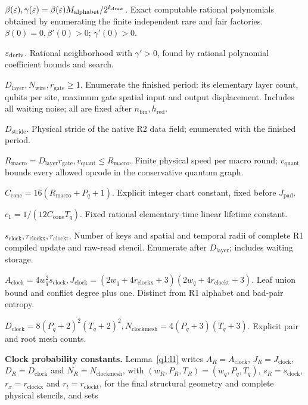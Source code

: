 \noindent\textbf{\(\beta(\varepsilon),\gamma(\varepsilon)=\beta(\varepsilon)M_{\mathrm{alphabet}}/2^{k_{\mathrm{draw}}}\)}. Exact computable rational polynomials obtained by enumerating the finite independent rare and fair factories. \(\beta(0)=0,\beta'(0)>0\); \(\gamma'(0)>0\).\par\smallskip
\noindent\textbf{\(\varepsilon_{\mathrm{deriv}}\)}. Rational neighborhood with \(\gamma'>0\), found by rational polynomial coefficient bounds and search.\par\smallskip
\noindent\textbf{\(D_{\mathrm{layer}},N_{\mathrm{wire}},r_{\mathrm{gate}}\ge 1\)}. Enumerate the finished period: its elementary layer count, qubits per site, maximum gate spatial input and output displacement. Includes all waiting noise; all are fixed after \(n_{\mathrm{bin}},h_{\mathrm{red}}\).\par\smallskip
\noindent\textbf{\(D_{\mathrm{stride}}\)}. Physical stride of the native R2 data field; enumerated with the finished period.\par\smallskip
\noindent\textbf{\(R_{\mathrm{macro}}=D_{\mathrm{layer}} r_{\mathrm{gate}},v_{\mathrm{quant}}\le R_{\mathrm{macro}}\)}. Finite physical speed per macro round; \(v_{\mathrm{quant}}\) bounds every allowed opcode in the conservative quantum graph.\par\smallskip
\noindent\textbf{\(C_{\mathrm{cone}}=16(R_{\mathrm{macro}}+P_{q}+1)\)}. Explicit integer chart constant, fixed before \(J_{\mathrm{pad}}\).\par\smallskip
\noindent\textbf{\(c_{1}=1/(12 C_{\mathrm{cone}} T_{q})\)}. Fixed rational elementary-time linear lifetime constant.\par\smallskip
\noindent\textbf{\(s_{\mathrm{clock}},r_{\mathrm{clockx}},r_{\mathrm{clockt}}\)}. Number of keys and spatial and temporal radii of complete R1 compiled update and raw-read stencil. Enumerate after \(D_{\mathrm{layer}}\); includes waiting storage.\par\smallskip
\noindent\textbf{\(A_{\mathrm{clock}}=4w_{q}^{2} s_{\mathrm{clock}},J_{\mathrm{clock}}=(2w_{q}+4r_{\mathrm{clockx}}+3)(2w_{q}+4r_{\mathrm{clockt}}+3)\)}. Leaf union bound and conflict degree plus one. Distinct from R1 alphabet and bad-pair entropy.\par\smallskip
\noindent\textbf{\(D_{\mathrm{clock}}=8(P_{q}+2)^{2}(T_{q}+2)^{2},N_{\mathrm{clockmesh}}=4(P_{q}+3)(T_{q}+3)\)}. Explicit pair and root mesh counts.\par\smallskip
\noindent\textbf{Clock probability constants.} Lemma~\ref{q1:l1} writes \(A_R=A_{\mathrm{clock}}\), \(J_R=J_{\mathrm{clock}}\), \(D_R=D_{\mathrm{clock}}\) and \(N_R=N_{\mathrm{clockmesh}}\), with \((w_R,P_R,T_R)=(w_q,P_q,T_q)\), \(s_R=s_{\mathrm{clock}}\), \(r_x=r_{\mathrm{clockx}}\) and \(r_t=r_{\mathrm{clockt}}\), for the final structural geometry and complete physical stencils, and sets
